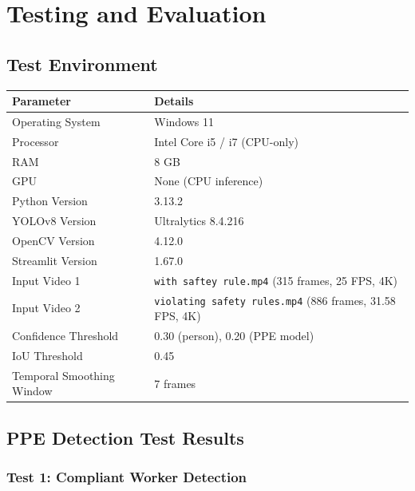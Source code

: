 \documentclass[12pt,a4paper]{report}
\begin{document}
\chapter{Testing and Evaluation}

\section{Test Environment}

\begin{center}
\renewcommand{\arraystretch}{1.3}
\begin{tabular}{|p{4.5cm}|p{7cm}|}
\hline
\textbf{Parameter}        & \textbf{Details} \\
\hline
Operating System          & Windows 11 \\
\hline
Processor                 & Intel Core i5 / i7 (CPU-only) \\
\hline
RAM                       & 8 GB \\
\hline
GPU                       & None (CPU inference) \\
\hline
Python Version            & 3.13.2 \\
\hline
YOLOv8 Version            & Ultralytics 8.4.216 \\
\hline
OpenCV Version            & 4.12.0 \\
\hline
Streamlit Version         & 1.67.0 \\
\hline
Input Video 1             & \texttt{with saftey rule.mp4} (315 frames, 25 FPS, 4K) \\
\hline
Input Video 2             & \texttt{violating safety rules.mp4} (886 frames, 31.58 FPS, 4K) \\
\hline
Confidence Threshold      & 0.30 (person), 0.20 (PPE model) \\
\hline
IoU Threshold             & 0.45 \\
\hline
Temporal Smoothing Window & 7 frames \\
\hline
\end{tabular}
\end{center}

\section{PPE Detection Test Results}

\subsection{Test 1: Compliant Worker Detection}
\end{document}
